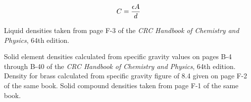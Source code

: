 \vskip 20pt

$$C = {\epsilon A \over d}$$














Liquid densities taken from page F-3 of the {\it CRC Handbook of Chemistry and Physics}, 64th edition.

\vskip 10pt

Solid element densities calculated from specific gravity values on pages B-4 through B-40 of the {\it CRC Handbook of Chemistry and Physics}, 64th edition.  Density for brass calculated from specific gravity figure of 8.4 given on page F-2 of the same book.  Solid compound densities taken from page F-1 of the same book.




